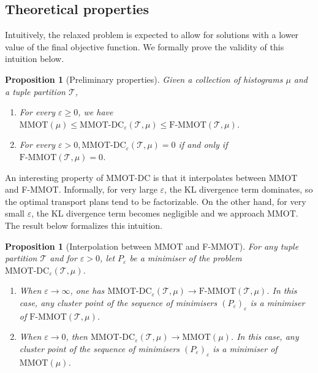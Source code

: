 \documentclass{article}
\newtheorem{proposition}[theorem]{Proposition}
\begin{document}
\subsection{Theoretical properties}
Intuitively, the relaxed problem is expected to allow for solutions with a lower value of the final objective function. We formally prove the validity of this intuition below.
\begin{proposition}[Preliminary properties] \label{MMOT_dc_prop}
  Given a collection of histograms $\mu$ and a tuple partition $\mathcal T$,
  \begin{enumerate}
    \item For every $\varepsilon \geq 0$, we have $\text{MMOT}(\mu) \leq 
    \text{MMOT-DC}_{\varepsilon}(\mathcal T, \mu) \leq \text{F-MMOT}( \mathcal T, \mu)$.
    \item For every $\varepsilon > 0, \text{MMOT-DC}_{\varepsilon}( \mathcal T, \mu ) = 0$ if and only if 
    $\text{F-MMOT} (\mathcal T, \mu) = 0$.
  \end{enumerate}
\end{proposition}
An interesting property of MMOT-DC is that it interpolates between MMOT and F-MMOT. Informally, 
for very large $\varepsilon$, the KL divergence term dominates, so the optimal transport plans tend to be factorizable. On the other hand, 
for very small $\varepsilon$, the KL divergence term becomes negligible and we approach MMOT. The result below formalizes this intuition.
\begin{proposition}[Interpolation between MMOT and F-MMOT] \label{interpolation_prop}
  For any tuple partition $\mathcal T$ and for $\varepsilon > 0$, 
  let $P_{\varepsilon}$ be a minimiser of the problem $\text{MMOT-DC}_{\varepsilon}(\mathcal T, \mu)$.
  \begin{enumerate}
    \item When $\varepsilon \to \infty$, one has $\text{MMOT-DC}_{\varepsilon}(\mathcal T, \mu) \to 
    \text{F-MMOT}(\mathcal T, \mu)$. In this case, any cluster point of the sequence of minimisers 
    $(P_{\varepsilon})_{\varepsilon}$ is a minimiser of $\text{F-MMOT}(\mathcal T, \mu)$.

    \item When $\varepsilon \to 0$, then $\text{MMOT-DC}_{\varepsilon}(\mathcal T, \mu) \to \text{MMOT}(\mu)$. 
    In this case, any cluster point of the sequence of minimisers $(P_{\varepsilon})_{\varepsilon}$ is a minimiser of 
    $\text{MMOT}(\mu)$.
  \end{enumerate}
\end{proposition}
\end{document}
